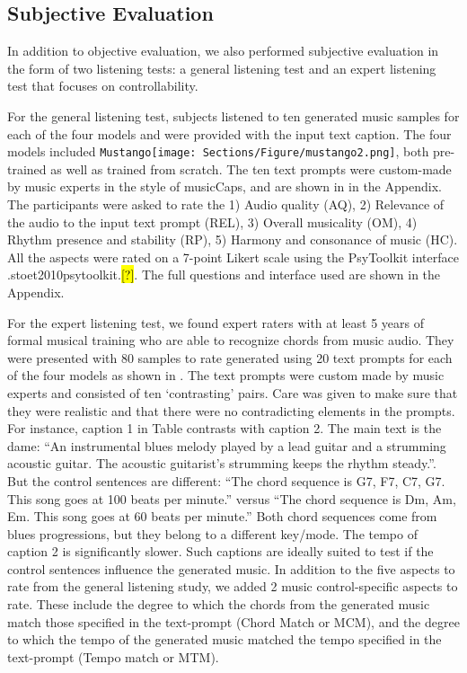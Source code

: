 \documentclass[11pt]{article}
\let\realcite\cite
\renewcommand{\cite}[1]{\ifx.#1.\hl{[?]}\else\realcite{#1}\fi}
\newcommand{\model}{\texttt{Mustango}}
\newcommand{\modelemoji}{\model{}\texttt{[image: Sections/Figure/mustango2.png]}}
\begin{document}
\subsection{Subjective Evaluation}
\label{sec:subjeval}
In addition to objective evaluation, we also performed subjective evaluation in the form of two listening tests: a general listening test and an expert listening test that focuses on controllability. 

For the general listening test, subjects listened to ten generated music samples for each of the four models and were provided with the input text caption. The four models included \modelemoji{}, both pre-trained as well as trained from scratch. The ten text prompts were custom-made by music experts in the style of musicCaps, and are shown in  in the Appendix. The participants were asked to rate the 1) Audio quality (AQ), 2) Relevance of the audio to the input text prompt (REL), 3) Overall musicality (OM), 4) Rhythm presence and stability (RP), 5) Harmony and consonance of music (HC). All the aspects were rated on a 7-point Likert scale using the PsyToolkit interface \cite{stoet2010psytoolkit}. The full questions and interface used are shown in the Appendix.  

For the expert listening test, we found expert raters with at least 5 years of formal musical training who are able to recognize chords from music audio. They were presented with 80 samples to rate generated using 20 text prompts for each of the four models as shown in . The text prompts were custom made by music experts and consisted of ten `contrasting' pairs. Care was given to make sure that they were realistic and that there were no contradicting elements in the prompts. For instance, caption 1 in Table contrasts with caption 2. The main text is the dame: ``An instrumental blues melody played by a lead guitar and a strumming acoustic guitar. The acoustic guitarist’s strumming keeps the rhythm steady.''. But the control sentences are different: ``The chord sequence is G7, F7, C7, G7. This song goes at 100 beats per minute.'' versus ``The chord sequence is Dm, Am, Em. This song goes at 60 beats per minute.'' Both chord sequences come from blues progressions, but they belong to a different key/mode. The tempo of caption 2 is significantly slower. Such captions are ideally suited to test if the control sentences influence the generated music. In addition to the five aspects to rate from the general listening study, we added 2 music control-specific aspects to rate. These include the degree to which the chords from the generated music match those specified in the text-prompt (Chord Match or MCM), and the degree to which the tempo of the generated music matched the tempo specified in the text-prompt (Tempo match or MTM).
\end{document}
